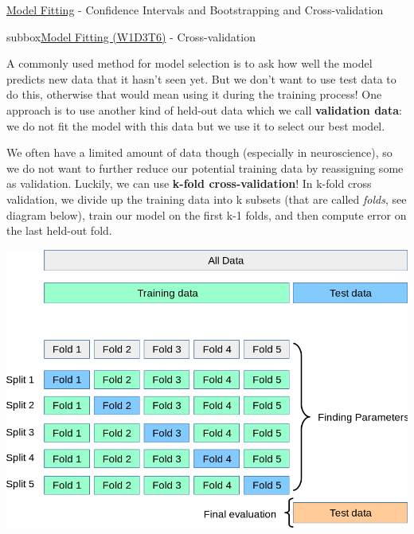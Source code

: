 \begin{textbox}{\href{https://compneuro.neuromatch.io/tutorials/W1D3_ModelFitting/student/W1D3_Tutorial2.html}{Model Fitting} -  Confidence Intervals and Bootstrapping and Cross-validation}
\begin{subbox}{subbox}{\href{https://compneuro.neuromatch.io/tutorials/W1D3_ModelFitting/student/W1D3_Tutorial6.html}{Model Fitting (W1D3T6)} -  Cross-validation}
\scriptsize

A commonly used method for model selection is to ask how well the model predicts new data that it hasn't seen yet. But we don't want to use test data to do this, otherwise that would mean using it during the training process! One approach is to use another kind of held-out data which we call \textbf{validation data}: we do not fit the model with this data but we use it to select our best model.

We often have a limited amount of data though (especially in neuroscience), so we do not want to further reduce our potential training data by reassigning some as validation. Luckily, we can use \textbf{k-fold cross-validation}! In k-fold cross validation, we divide up the training data into k subsets (that are called \textit{folds}, see diagram below), train our model on the first k-1 folds, and then compute error on the last held-out fold.

\centering
\includegraphics[scale=0.14]{Figures/ModelFitting/MFFigure7.png}

\end{subbox}
\end{textbox}
